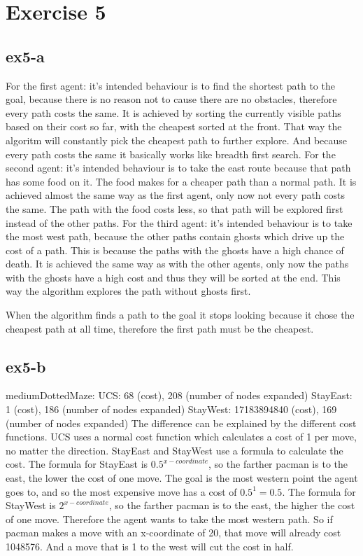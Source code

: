 \section{Exercise 5}
\subsection{ex5-a}
For the first agent: it's intended behaviour is to find the shortest path to the goal, because there is no
reason not to cause there are no obstacles, therefore every path costs the same. 
It is achieved by sorting the currently visible paths based on their cost so far, with the cheapest sorted 
at the front. That way the algoritm will constantly pick the cheapest path to further explore. 
And because every path costs the same it basically works like breadth first search.
For the second agent: it's intended behaviour is to take the east route because that path has some food on it.
The food makes for a cheaper path than a normal path. It is achieved almost the same way as the first agent, 
only now not every path costs the same. The path with the food costs less, so that path will be explored 
first instead of the other paths.
For the third agent: it's intended behaviour is to take the most west path, because the other paths contain 
ghosts which drive up the cost of a path. This is because the paths with the ghosts have a high chance of death.
It is achieved the same way as with the other agents, only now the paths with the ghosts have a high cost and 
thus they will be sorted at the end. This way the algorithm explores the path without ghosts first.

When the algorithm finds a path to the goal it stops looking because it chose the cheapest path at all time,
therefore the first path must be the cheapest.


\subsection{ex5-b}
mediumDottedMaze:
UCS: 68 (cost), 208 (number of nodes expanded)
StayEast: 1 (cost), 186 (number of nodes expanded)
StayWest: 17183894840 (cost), 169 (number of nodes expanded)
The difference can be explained by the different cost functions. UCS uses a normal cost function which
calculates a cost of 1 per move, no matter the direction. StayEast and StayWest use a formula to calculate the cost. 
The formula for StayEast is $0.5^{x-coordinate}$, so the farther pacman is to the east, 
the lower the cost of one move. The goal is the most western point the agent goes to, 
and so the most expensive move has a cost of $0.5^1 = 0.5$.
The formula for StayWest is $2^{x-coordinate}$, so the farther pacman is to the east, the higher the cost of one move.
Therefore the agent wants to take the most western path. So if pacman makes a move with an x-coordinate of 20,
that move will already cost 1048576. And a move that is 1 to the west will cut the cost in half.